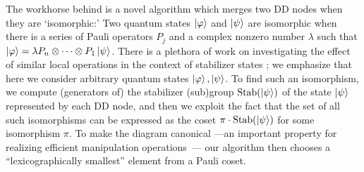The workhorse behind \limdds is a novel algorithm which merges two DD nodes when they are `isomorphic:'
Two quantum states $\ket{\varphi}$ and $\ket{\psi}$ are isomorphic when there is a series of Pauli operators $P_j$ and a complex nonzero number $\lambda$ such that $\ket{\varphi}=\lambda P_n\otimes\cdots\otimes P_1\ket \psi$.
There is a plethora of work on investigating the effect of similar local operations in the context of stabilizer states \cite{nest2005local, englbrecht2020symmetries}; we emphasize that here we consider arbitrary quantum states $\ket{\varphi}, \ket{\psi}$.%
To find such an isomorphism, we compute (generators of) the stabilizer (sub)group $\text{Stab}(\ket \psi)$ of the state $\ket \psi$ represented by each DD node, and then we exploit the fact that the set of all such isomorphisms can be expressed as the coset $\pi\cdot \text{Stab}(\ket \psi)$ for some isomorphism $\pi$.
To make the diagram canonical ---an important property for realizing efficient manipulation operations~\cite{darwiche2002knowledge}---
our algorithm then chooses a ``lexicographically smallest'' element from a Pauli coset.












